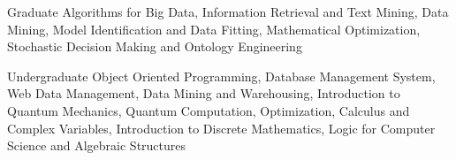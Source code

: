 \begin{cventries}
  \cventry
    {Graduate}
    {}
    {}
    {}
    {
     Algorithms for Big Data, Information Retrieval and Text Mining, Data Mining, Model Identification and Data Fitting, Mathematical Optimization, Stochastic Decision Making and Ontology Engineering
    }
    
  \cventry
    {Undergraduate}
    {}
    {}
    {}
    {
      Object Oriented Programming, Database Management System, Web Data Management, Data Mining and Warehousing, Introduction to Quantum Mechanics, Quantum Computation, Optimization, Calculus and Complex Variables, Introduction to Discrete Mathematics, Logic for Computer Science and Algebraic Structures
    }
\end{cventries}
